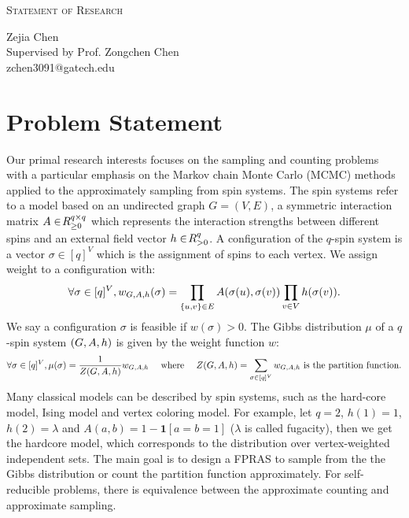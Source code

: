 \documentclass[letterpaper]{article}
\makeatletter
\newcommand{\soptitle}{Statement of Research}
\newcommand{\yourname}{Zejia Chen}
\newcommand{\youremail}{zchen3091@gatech.edu}
\newcommand{\amper}{{\fontspec[Scale=.95]{Adobe Caslon Pro}\selectfont\itshape\&~{}}}
\makeatother
\begin{document}
\begin{center}{\huge \scshape \soptitle}\end{center}
\begin{center}\vspace{0.2em} {\Large \yourname\\Supervised by Prof. Zongchen Chen\\}
  {\youremail}\end{center}

\section*{Problem Statement}
Our primal research interests focuses on the sampling and counting problems with a particular emphasis on the Markov chain Monte Carlo (MCMC) methods applied to the approximately sampling from spin systems.
The spin systems refer to a model based on an undirected graph $G = (V,E)$, a symmetric interaction matrix $\*A\in \!R_{\geq 0}^{q\times q}$ which represents the interaction strengths between different spins and an external field vector $\*h \in \!R_{>0}^q$.
A configuration of the $q$-spin system is a vector $\sigma \in [q]^V$ which is the assignment of spins to each vertex.
We assign weight to a configuration with:
\[
    \forall \sigma \in [q]^V, w_{G,\*A,\*h}(\sigma) = \prod_{\{u,v\}\in E} \*A(\sigma(u),\sigma(v)) \prod_{v\in V} \*h(\sigma(v)) .
\]
We say a configuration $\sigma$ is feasible if $w(\sigma) > 0$.
The Gibbs distribution $\mu$ of a $q$-spin system $(G,\*A,\*h)$ is given by the weight function $w$: 
$$
    \forall \sigma \in [q]^V, \mu(\sigma) = \frac{1}{Z(G,\*A,\*h)}w_{G,\*A,\*h} \quad \text{ where }\quad Z(G,\*A,\*h) = \sum_{\sigma \in [q]^V} w_{G,\*A,\*h} \text{ is the partition function}.
$$
Many classical models can be described by spin systems, such as the hard-core model, Ising model and vertex coloring model.
For example, let $q = 2$, $h(1) = 1$, $h(2) = \lambda$ and $A(a,b) = 1 - \mathbf 1[a=b=1]$ ($\lambda$ is called fugacity), then we get the hardcore model, which corresponds to the distribution over vertex-weighted independent sets.
The main goal is to design a FPRAS to sample from the the Gibbs distribution or count the partition function approximately.
For self-reducible problems, there is equivalence between the approximate counting and approximate sampling.
\end{document}
